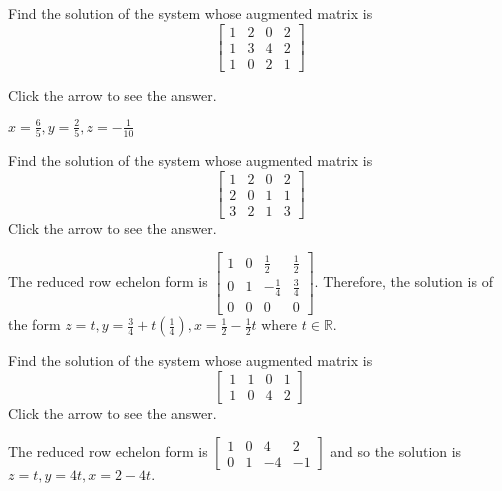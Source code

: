 \documentclass{ximera}
\begin{document}
\begin{problem}\label{prb:2.25} Find the solution of the system whose augmented matrix is
\begin{equation*}
\left[
\begin{array}{rrr|r}
1 & 2 & 0 & 2 \\
1 & 3 & 4 & 2 \\
1 & 0 & 2 & 1
\end{array}
\right]
\end{equation*}

Click the arrow to see the answer. 
\begin{expandable}
$x=\frac{6}{5}, y=\frac{2}{5}, z=-\frac{1}{10}$
\end{expandable}
\end{problem}

\begin{problem}\label{prb:2.26} Find the solution of the system whose augmented matrix is
\begin{equation*}
\left[
\begin{array}{rrr|r}
1 & 2 & 0 & 2 \\
2 & 0 & 1 & 1 \\
3 & 2 & 1 & 3
\end{array}
\right]
\end{equation*}
Click the arrow to see the answer. 
\begin{expandable}
The reduced row echelon form is $\left[
\begin{array}{rrr|r}
1 & 0 &  \frac{1}{2} &  \frac{1}{2} \\
0 & 1 & - \frac{1}{4} &  \frac{3}{4} \\
0 & 0 & 0 & 0
\end{array}
\right] .$ Therefore, the solution is of the form $z=t,y=\frac{3}{4}+t\left(
\frac{1}{4}\right) ,x=\frac{1}{2}-\frac{1}{2}t$ where $t\in \mathbb{R}$.
\end{expandable}
\end{problem}

\begin{problem}\label{prb:2.27} Find the solution of the system whose augmented matrix is
\begin{equation*}
\left[
\begin{array}{rrr|r}
1 & 1 & 0 & 1 \\
1 & 0 & 4 & 2
\end{array}
\right]
\end{equation*}
Click the arrow to see the answer. 
\begin{expandable}
The reduced row echelon form is $\left[
\begin{array}{rrr|r}
1 & 0 & 4 & 2 \\
0 & 1 & -4 & -1
\end{array}
\right] $ and so the solution is $z=t,y=4t,x=2-4t.$
\end{expandable}
\end{problem}
\end{document}
